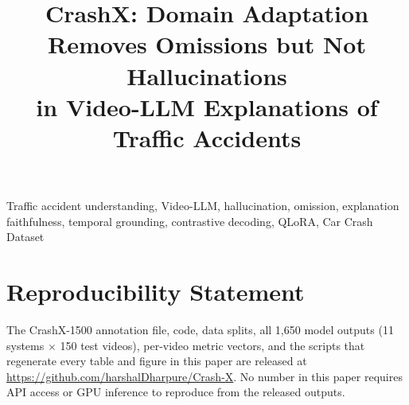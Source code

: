 \documentclass[conference]{IEEEtran}
\newcommand{\dataset}{CrashX-1500}
\begin{document}
\title{CrashX: Domain Adaptation Removes Omissions but Not Hallucinations\\in Video-LLM Explanations of Traffic Accidents}

\author{
}

\maketitle

\begin{abstract}

\end{abstract}

\begin{IEEEkeywords}
Traffic accident understanding, Video-LLM, hallucination, omission, explanation faithfulness, temporal grounding, contrastive decoding, QLoRA, Car Crash Dataset
\end{IEEEkeywords}













\appendix


\section*{Reproducibility Statement}
The \dataset{} annotation file, code, data splits, all 1{,}650 model outputs (11 systems $\times$ 150 test videos), per-video metric vectors, and the scripts that regenerate every table and figure in this paper are released at
\url{https://github.com/harshalDharpure/Crash-X}.
No number in this paper requires API access or GPU inference to reproduce from the released outputs.



\end{document}
